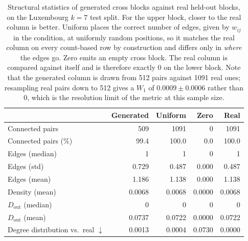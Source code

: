 \begin{table}[H]
\centering
\caption{Structural statistics of generated cross blocks against real held-out
blocks, on the Luxembourg $k{=}7$ test split. For the upper block, closer to
the real column is better. Uniform places the correct number of edges, given by
$w_{ij}$ in the condition, at uniformly random positions, so it matches the real
column on every count-based row by construction and differs only in \emph{where}
the edges go. Zero emits an empty cross block. The real column is compared against
itself and is therefore exactly $0$ on the lower block. Note that the generated
column is drawn from 512 pairs against 1091 real ones; resampling real
pairs down to 512 gives a $W_1$ of $0.0009 \pm 0.0006$
rather than $0$, which is the resolution limit of the metric at this sample
size.}\label{tab:dinter-stats}
\begin{tabular}{lrrrr}
\toprule
& Generated & Uniform & Zero & Real \\
\midrule
Connected pairs                           & 509 & 1091 & 0 & 1091 \\
Connected pairs (\%)                      & 99.4 & 100.0 & 0.0 & 100.0 \\
Edges (median)                            & 1 & 1 & 0 & 1 \\
Edges (std)                               & 0.729 & 0.487 & 0.000 & 0.487 \\
Edges (mean)                              & 1.186 & 1.138 & 0.000 & 1.138 \\
Density (mean)                            & 0.0068 & 0.0068 & 0.0000 & 0.0068 \\
$D_{\mathrm{out}}$ (median)               & 0 & 0 & 0 & 0 \\
$D_{\mathrm{out}}$ (mean)                 & 0.0737 & 0.0722 & 0.0000 & 0.0722 \\
\midrule
Degree distribution vs.\ real $\downarrow$ & 0.0013 & 0.0004 & 0.0730 & 0.0000 \\
\bottomrule
\end{tabular}
\end{table}
